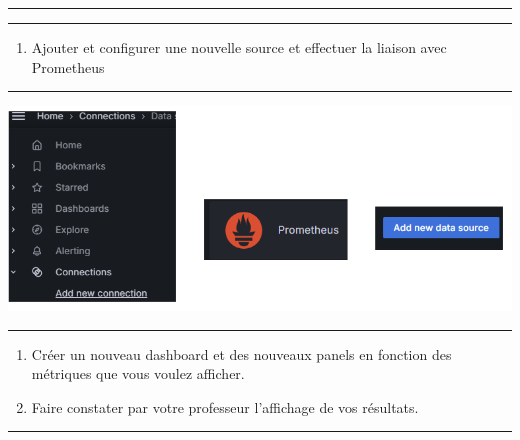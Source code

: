 \documentclass[french, 12pt]{article}%
\newif\ifPROF
\begin{document}
\begin{center}
 \rule{0.75\linewidth}{1pt}
 \end{center}
\ifPROF
\color{red}
\begin{lstlisting}[style=commande]  
Pour ce connecter : http://192.168.1.111:3000/
Il faut juste faire attention au port
\end{lstlisting}

\normalcolor
\fi

\begin{center}
 \rule{0.75\linewidth}{1pt}
 \end{center}

\begin{enumerate}[resume]
\item Ajouter et configurer une nouvelle source et effectuer la liaison avec Prometheus
\end{enumerate}


\begin{center}
 \rule{0.75\linewidth}{1pt}
 \end{center}
\begin{center}
\includegraphics[scale=0.7]{./ressource/grafana_NewConnection.png}
\end{center}



\begin{center}
 \rule{0.75\linewidth}{1pt}
 \end{center}

\begin{enumerate}[resume]
\item Créer un nouveau dashboard et des nouveaux panels en fonction des métriques que vous voulez afficher.
\item Faire constater par votre professeur l'affichage de vos résultats. 
\end{enumerate}


\begin{center}
 \rule{0.75\linewidth}{1pt}
 \end{center}
\end{document}
